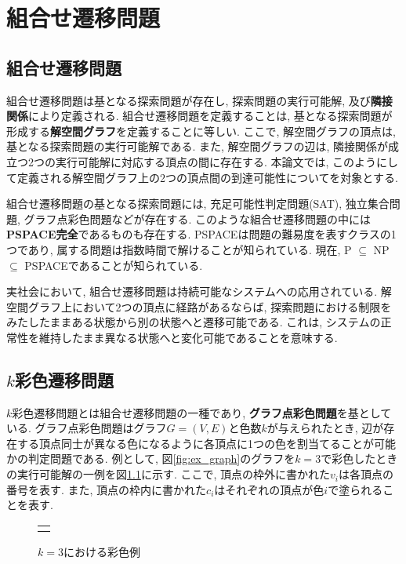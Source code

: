 \chapter{組合せ遷移問題} \label{chap:background}

\section{組合せ遷移問題}
組合せ遷移問題は基となる探索問題が存在し, 探索問題の実行可能解, 及び\textbf{隣接関係}により定義される.
組合せ遷移問題を定義することは, 基となる探索問題が形成する\textbf{解空間グラフ}を定義することに等しい.
ここで, 解空間グラフの頂点は, 基となる探索問題の実行可能解である. 
また, 解空間グラフの辺は, 隣接関係が成立つ2つの実行可能解に対応する頂点の間に存在する.
本論文では, このようにして定義される解空間グラフ上の2つの頂点間の到達可能性についてを対象とする.

組合せ遷移問題の基となる探索問題には, 充足可能性判定問題(SAT), 独立集合問題, グラフ点彩色問題などが存在する.
このような組合せ遷移問題の中には\textbf{PSPACE完全}であるものも存在する. 
PSPACEは問題の難易度を表すクラスの1つであり, 属する問題は指数時間で解けることが知られている. 
現在, P $\subseteq$ NP $\subseteq$ PSPACEであることが知られている.

実社会において, 組合せ遷移問題は持続可能なシステムへの応用されている. 
解空間グラフ上において2つの頂点に経路があるならば, 探索問題における制限をみたしたままある状態から別の状態へと遷移可能である. 
これは, システムの正常性を維持したまま異なる状態へと変化可能であることを意味する.

\section{$k$彩色遷移問題}
$k$彩色遷移問題とは組合せ遷移問題の一種であり, \textbf{グラフ点彩色問題}を基としている. 
グラフ点彩色問題はグラフ$G=(V, E)$と色数$k$が与えられたとき, 辺が存在する頂点同士が異なる色になるように各頂点に1つの色を割当てることが可能かの判定問題である. 
例として, 図\ref{fig:ex_graph}のグラフを$k=3$で彩色したときの実行可能解の一例を図\ref{fig:graph_col}に示す. 
ここで, 頂点の枠外に書かれた$v_i$は各頂点の番号を表す.
また, 頂点の枠内に書かれた$c_i$はそれぞれの頂点が色$i$で塗られることを表す.

\begin{figure}[htbp]
  \centering
  \begin{tabular}{c}
    
    \begin{minipage}{0.45\hsize}
      \centering
      
      \caption{グラフ例}
      \label{fig:ex_graph}
    \end{minipage}

    \begin{minipage}{0.45\hsize}
      \centering
      
      \caption{$k=3$における彩色例}
      \label{fig:graph_col}
    \end{minipage}

  \end{tabular}  
\end{figure}

